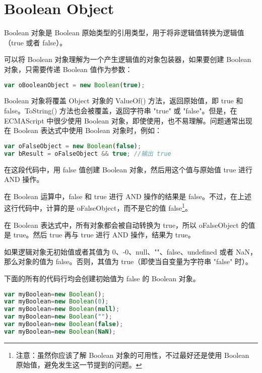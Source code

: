 \section{Boolean Object}

Boolean 对象是 Boolean 原始类型的引用类型，用于将非逻辑值转换为逻辑值（true 或者 false）。


可以将 Boolean 对象理解为一个产生逻辑值的对象包装器，如果要创建 Boolean 对象，只需要传递 Boolean 值作为参数：



\begin{lstlisting}[language=JavaScript]
var oBooleanObject = new Boolean(true);
\end{lstlisting}



Boolean 对象将覆盖 Object 对象的 ValueOf() 方法，返回原始值，即 true 和 false。ToString() 方法也会被覆盖，返回字符串 "true" 或 "false"。但是，在 ECMAScript 中很少使用 Boolean 对象，即使使用，也不易理解。问题通常出现在 Boolean 表达式中使用 Boolean 对象时，例如：



\begin{lstlisting}[language=JavaScript]
var oFalseObject = new Boolean(false);
var bResult = oFalseObject && true;	//输出 true
\end{lstlisting}



在这段代码中，用 false 值创建 Boolean 对象，然后用这个值与原始值 true 进行 AND 操作。

在 Boolean 运算中，false 和 true 进行 AND 操作的结果是 false。不过，在上述这行代码中，计算的是 oFalseObject，而不是它的值 false\footnote{注意：虽然你应该了解 Boolean 对象的可用性，不过最好还是使用 Boolean 原始值，避免发生这一节提到的问题。}。

在 Boolean 表达式中，所有对象都会被自动转换为 true，所以 oFalseObject 的值是 true。然后 true 再与 true 进行 AND 操作，结果为 true。

如果逻辑对象无初始值或者其值为 0、-0、null、""、false、undefined 或者 NaN，那么对象的值为 false。否则，其值为 true（即使当自变量为字符串 "false" 时）。

下面的所有的代码行均会创建初始值为 false 的 Boolean 对象。


\begin{lstlisting}[language=JavaScript]
var myBoolean=new Boolean();
var myBoolean=new Boolean(0);
var myBoolean=new Boolean(null);
var myBoolean=new Boolean("");
var myBoolean=new Boolean(false);
var myBoolean=new Boolean(NaN);
\end{lstlisting}

